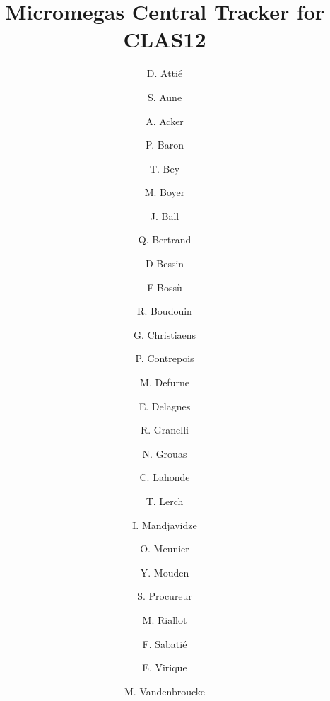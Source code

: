 \title{Micromegas Central Tracker for CLAS12}

\author[A]{D. Atti\'e}
\author[A]{S. Aune}
\author[A]{}
\author[A]{}

\author[A]{A. Acker} 
\author[A]{P. Baron}
\author[A]{T. Bey}
\author[A]{M. Boyer}
\author[A]{J. Ball}
\author[A]{Q. Bertrand}
\author[A]{D Bessin}
\author[A]{F Boss\`u}
\author[A]{R. Boudouin}
\author[A]{G. Christiaens}
\author[A]{P. Contrepois}
\author[A]{M. Defurne}
\author[A]{E. Delagnes}
\author[A]{R. Granelli}
\author[A]{N. Grouas}
\author[A]{C. Lahonde}
\author[A]{T. Lerch}
\author[A]{I. Mandjavidze}
\author[A]{O. Meunier}
\author[A]{Y. Mouden}
\author[A]{S. Procureur}
\author[A]{M. Riallot}
\author[A]{F. Sabati\'e}
\author[A]{E. Virique}
\author[A]{M. Vandenbroucke}



\address[A]{CEA-Saclay, Gif-sur-Yvettes, France}

